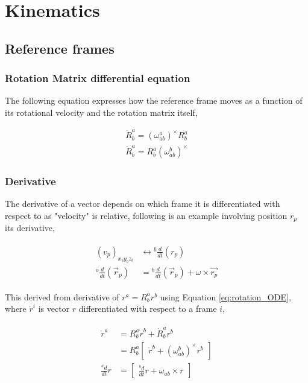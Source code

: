 \section{Kinematics}

\subsection{Reference frames}

\subsubsection{Rotation Matrix differential equation}

The following equation expresses how the reference frame moves as a function of its rotational velocity and the rotation matrix itself,

\begin{equation} \label{eq:rotation_ODE}
    \begin{aligned}
    \dot{R}^a_b = (\omega^a_{ab})^\times R^a_b \\
    \dot{R}^a_b = R^a_b(\omega^b_{ab})^\times
    \end{aligned}
\end{equation}

\subsubsection{Derivative}

The derivative of a vector depends on which frame it is differentiated with respect to as "velocity" is relative, following is an example involving position $r_p$ its derivative,

\begin{align} \label{eq:reference_frame_derivative}
    \begin{split}
        (v_p)_{x_by_bz_b} &\leftrightarrow {}^b\frac{d}{dt}(r_p)
        \\
        {}^o \frac{d}{dt}(\Vec{r}_p) &= {}^b\frac{d}{dt}(\Vec{r}_p) + \omega \times \Vec{r_p}
    \end{split}
\end{align}

This derived from derivative of $r^a = R^a_b r^b$ using Equation \eqref{eq:rotation_ODE}, where $\Dot{r}^i$ is vector $r$ differentiated with respect to a frame $i$,

\begin{align}
    \begin{split}
        \Dot{r}^a &= R^a_b \Dot{r}^b + \Dot{R}^a_b r^b
        \\
        &= R^a_b \begin{bmatrix}
            \Dot{r}^b + (\omega^b_{ab})^\times r^b
        \end{bmatrix}
        \\
        \frac{^ad}{dt} r &= \begin{bmatrix}
            \frac{^bd}{dt} r + \omega_{ab} \times r
        \end{bmatrix}
    \end{split}
\end{align}

